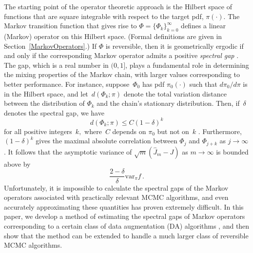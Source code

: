 \documentclass[11pt]{article}
\begin{document}
        The starting point of the operator theoretic approach is the
        Hilbert space of functions that are square integrable with
        respect to the target pdf, $\pi(\cdot)$.  The Markov
        transition function that gives rise to $\Phi =
        \{\Phi_k\}_{k=0}^{\infty}$ defines a linear (Markov) operator
        on this Hilbert space.  (Formal definitions are given in
        Section~\ref{MarkovOperators}.)  If $\Phi$ is reversible, then
        it is geometrically ergodic if and only if the corresponding
        Markov operator admits a positive \textit{spectral gap}
        \citep{roberts1997geometric,kontoyiannis2012geometric}.  The
        gap, which is a real number in $(0,1]$, plays a fundamental role
        in determining the mixing properties of the Markov chain, with
        larger values corresponding to better performance.  For
        instance, suppose~$\Phi_0$ has pdf $\pi_0(\cdot)$ such that
        $d\pi_0/d\pi$ is in the Hilbert space, and let~$d(\Phi_k;
        \pi)$ denote the total variation distance between the
        distribution of $\Phi_k$ and the chain's stationary
        distribution.  Then, if~$\delta$ denotes the spectral gap, we
        have
	\[
	d(\Phi_k;\pi) \leq C(1-\delta)^k
	\]
	for all positive integers~$k,$ where~$C$ depends on $\pi_0$
        but not on~$k$ \citep{roberts1997geometric}.  Furthermore,
        $(1-\delta)^k$ gives the maximal absolute correlation between
        $\Phi_j$ and $\Phi_{j+k}$ as $j \to \infty$.  It follows
        \citep[see e.g.][]{mira1999ordering} that the asymptotic
        variance of $\sqrt{m}(\hat{J}_m - J)$ as $m \to \infty$ is
        bounded above by
	\[
	\frac{2-\delta}{\delta} \mathrm{var}_{\pi}f \,.
	\]
	Unfortunately, it is impossible to calculate the spectral gaps
        of the Markov operators associated with practically relevant
        MCMC algorithms, and even accurately approximating these
        quantities has proven extremely difficult.  In this paper, we
        develop a method of estimating the spectral gaps of Markov
        operators corresponding to a certain class of data
        augmentation (DA) algorithms \citep{tanner1987calculation},
        and then show that the method can be extended to handle a much
        larger class of reversible MCMC algorithms.
\end{document}
